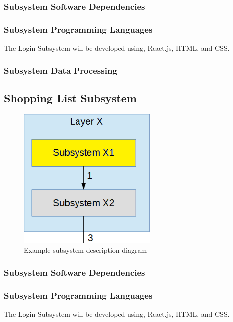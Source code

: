\subsubsection{Subsystem Software Dependencies}

\subsubsection{Subsystem Programming Languages}
The Login Subsystem will be developed using, React.js, HTML, and CSS.

\subsubsection{Subsystem Data Processing}

\subsection{Shopping List Subsystem}

\begin{figure}[h!]
	\centering
 	\includegraphics[width=0.60\textwidth]{images/subsystem}
 \caption{Example subsystem description diagram}
\end{figure}

\subsubsection{Subsystem Software Dependencies}

\subsubsection{Subsystem Programming Languages}
The Login Subsystem will be developed using, React.js, HTML, and CSS.

